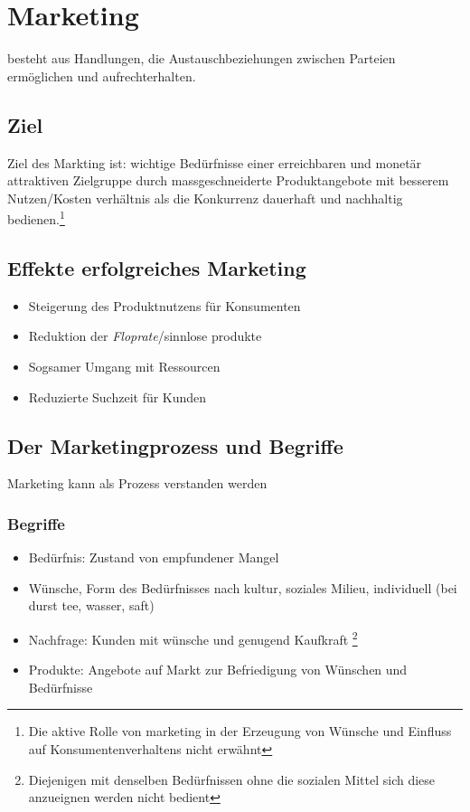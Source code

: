 
\section{Marketing}

\begin{definition}
    [Marketing] besteht aus Handlungen, die Austauschbeziehungen zwischen Parteien ermöglichen und aufrechterhalten.
\end{definition}

\subsection{Ziel}
Ziel des Markting ist: wichtige Bedürfnisse einer erreichbaren und monetär attraktiven Zielgruppe durch massgeschneiderte Produktangebote mit besserem Nutzen/Kosten verhältnis als die Konkurrenz dauerhaft und nachhaltig bedienen.\footnote{Die aktive Rolle von marketing in der Erzeugung von Wünsche und Einfluss auf Konsumentenverhaltens nicht erwähnt}

\subsection{Effekte erfolgreiches Marketing}

\begin{itemize}
    \item Steigerung des Produktnutzens für Konsumenten
    \item Reduktion der \textit{Floprate}/sinnlose produkte
    \item Sogsamer Umgang mit Ressourcen
    \item Reduzierte Suchzeit für Kunden
\end{itemize}

\subsection{Der Marketingprozess und Begriffe}
Marketing kann als Prozess verstanden werden

\subsubsection{Begriffe}

\begin{itemize}
    \item Bedürfnis: Zustand von empfundener Mangel
    \item Wünsche, Form des Bedürfnisses nach kultur, soziales Milieu, individuell (bei durst tee, wasser, saft)
    \item Nachfrage: Kunden mit wünsche und genugend Kaufkraft \footnote{Diejenigen mit denselben Bedürfnissen ohne die sozialen Mittel sich diese anzueignen werden nicht bedient}
    \item Produkte: Angebote auf Markt zur Befriedigung von Wünschen und Bedürfnisse
\end{itemize}

